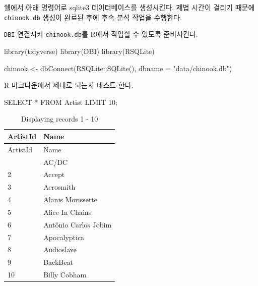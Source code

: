 \documentclass[
  letterpaper,
  chapter,a4paper,showtrims,openright,hidelinks]{oblivoir}
\newenvironment{Shaded}{\begin{snugshade}}{\end{snugshade}}
\newcommand{\AttributeTok}[1]{\textcolor[rgb]{0.40,0.45,0.13}{#1}}
\newcommand{\DecValTok}[1]{\textcolor[rgb]{0.68,0.00,0.00}{#1}}
\newcommand{\ExtensionTok}[1]{\textcolor[rgb]{0.00,0.23,0.31}{#1}}
\newcommand{\FunctionTok}[1]{\textcolor[rgb]{0.28,0.35,0.67}{#1}}
\newcommand{\KeywordTok}[1]{\textcolor[rgb]{0.00,0.23,0.31}{#1}}
\newcommand{\NormalTok}[1]{\textcolor[rgb]{0.00,0.23,0.31}{#1}}
\newcommand{\OperatorTok}[1]{\textcolor[rgb]{0.37,0.37,0.37}{#1}}
\newcommand{\OtherTok}[1]{\textcolor[rgb]{0.00,0.23,0.31}{#1}}
\newcommand{\SpecialCharTok}[1]{\textcolor[rgb]{0.37,0.37,0.37}{#1}}
\newcommand{\StringTok}[1]{\textcolor[rgb]{0.13,0.47,0.30}{#1}}
\begin{document}
쉘에서 아래 명령어로 sqlite3 데이터베이스를 생성시킨다. 제법 시간이
걸리기 때문에 \texttt{chinook.db} 생성이 완료된 후에 후속 분석 작업을
수행한다.

\begin{Shaded}
\end{Shaded}

\texttt{DBI} 연결시켜 \texttt{chinook.db}를 R에서 작업할 수 있도록
준비시킨다.

\begin{Shaded}
\begin{Highlighting}[]
\FunctionTok{library}\NormalTok{(tidyverse)}
\FunctionTok{library}\NormalTok{(DBI)}
\FunctionTok{library}\NormalTok{(RSQLite)}

\NormalTok{chinook }\OtherTok{\textless{}{-}} \FunctionTok{dbConnect}\NormalTok{(RSQLite}\SpecialCharTok{::}\FunctionTok{SQLite}\NormalTok{(), }\AttributeTok{dbname =} \StringTok{"data/chinook.db"}\NormalTok{)}
\end{Highlighting}
\end{Shaded}

R 마크다운에서 제대로 되는지 테스트 한다.

\begin{Shaded}
\begin{Highlighting}[]
\KeywordTok{SELECT} \OperatorTok{*} \KeywordTok{FROM}\NormalTok{ Artist }\KeywordTok{LIMIT} \DecValTok{10}\NormalTok{;}
\end{Highlighting}
\end{Shaded}

\begin{longtable}[]{@{}ll@{}}
\caption{Displaying records 1 - 10}\tabularnewline
\toprule\noalign{}
ArtistId & Name \\
\midrule\noalign{}
\endfirsthead
\toprule\noalign{}
ArtistId & Name \\
\midrule\noalign{}
\endhead
\bottomrule\noalign{}
\endlastfoot
1 & AC/DC \\
2 & Accept \\
3 & Aerosmith \\
4 & Alanis Morissette \\
5 & Alice In Chains \\
6 & Antônio Carlos Jobim \\
7 & Apocalyptica \\
8 & Audioslave \\
9 & BackBeat \\
10 & Billy Cobham \\
\end{longtable}
\end{document}
